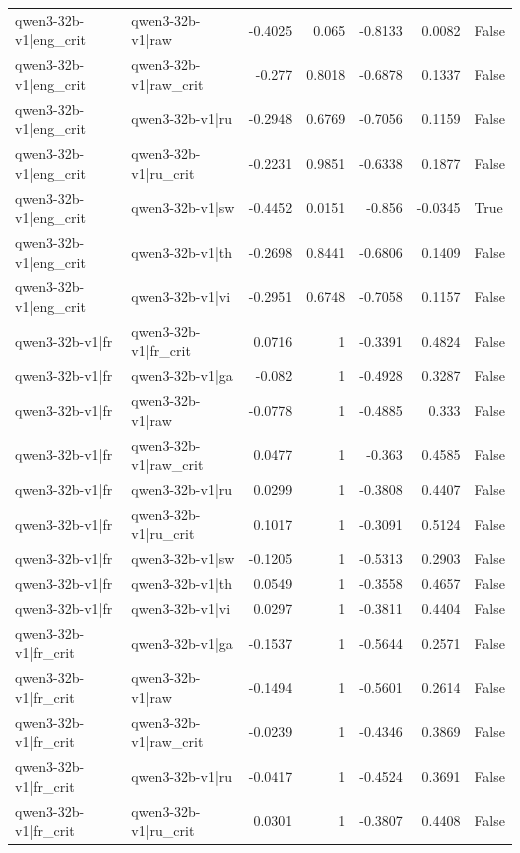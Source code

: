 \begin{table}
\begin{tabular}{l l r r r r l}
qwen3-32b-v1|eng_crit & qwen3-32b-v1|raw & -0.4025 & 0.065 & -0.8133 & 0.0082 & False \\
qwen3-32b-v1|eng_crit & qwen3-32b-v1|raw_crit & -0.277 & 0.8018 & -0.6878 & 0.1337 & False \\
qwen3-32b-v1|eng_crit & qwen3-32b-v1|ru & -0.2948 & 0.6769 & -0.7056 & 0.1159 & False \\
qwen3-32b-v1|eng_crit & qwen3-32b-v1|ru_crit & -0.2231 & 0.9851 & -0.6338 & 0.1877 & False \\
qwen3-32b-v1|eng_crit & qwen3-32b-v1|sw & -0.4452 & 0.0151 & -0.856 & -0.0345 & True \\
qwen3-32b-v1|eng_crit & qwen3-32b-v1|th & -0.2698 & 0.8441 & -0.6806 & 0.1409 & False \\
qwen3-32b-v1|eng_crit & qwen3-32b-v1|vi & -0.2951 & 0.6748 & -0.7058 & 0.1157 & False \\
qwen3-32b-v1|fr & qwen3-32b-v1|fr_crit & 0.0716 & 1 & -0.3391 & 0.4824 & False \\
qwen3-32b-v1|fr & qwen3-32b-v1|ga & -0.082 & 1 & -0.4928 & 0.3287 & False \\
qwen3-32b-v1|fr & qwen3-32b-v1|raw & -0.0778 & 1 & -0.4885 & 0.333 & False \\
qwen3-32b-v1|fr & qwen3-32b-v1|raw_crit & 0.0477 & 1 & -0.363 & 0.4585 & False \\
qwen3-32b-v1|fr & qwen3-32b-v1|ru & 0.0299 & 1 & -0.3808 & 0.4407 & False \\
qwen3-32b-v1|fr & qwen3-32b-v1|ru_crit & 0.1017 & 1 & -0.3091 & 0.5124 & False \\
qwen3-32b-v1|fr & qwen3-32b-v1|sw & -0.1205 & 1 & -0.5313 & 0.2903 & False \\
qwen3-32b-v1|fr & qwen3-32b-v1|th & 0.0549 & 1 & -0.3558 & 0.4657 & False \\
qwen3-32b-v1|fr & qwen3-32b-v1|vi & 0.0297 & 1 & -0.3811 & 0.4404 & False \\
qwen3-32b-v1|fr_crit & qwen3-32b-v1|ga & -0.1537 & 1 & -0.5644 & 0.2571 & False \\
qwen3-32b-v1|fr_crit & qwen3-32b-v1|raw & -0.1494 & 1 & -0.5601 & 0.2614 & False \\
qwen3-32b-v1|fr_crit & qwen3-32b-v1|raw_crit & -0.0239 & 1 & -0.4346 & 0.3869 & False \\
qwen3-32b-v1|fr_crit & qwen3-32b-v1|ru & -0.0417 & 1 & -0.4524 & 0.3691 & False \\
qwen3-32b-v1|fr_crit & qwen3-32b-v1|ru_crit & 0.0301 & 1 & -0.3807 & 0.4408 & False \\

\end{tabular}
\end{table}

